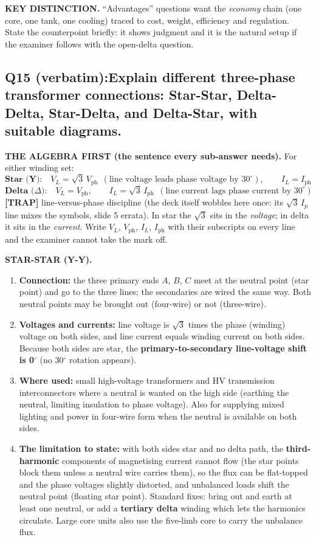 \documentclass[11pt]{article}
\newcommand{\qhead}[2]{\subsection*{\color{copper}#1\quad\color{iron}#2}}
\newcommand{\tagline}[1]{\textbf{\color{copper}#1}}
\newcommand{\keydist}[1]{\vspace{2pt}\textbf{\color{red}KEY DISTINCTION.} #1}
\newcommand{\trap}[1]{\vspace{2pt}\textbf{\color{red}[TRAP]} #1}
\begin{document}
\keydist{``Advantages'' questions want the \emph{economy} chain (one core, one tank, one cooling) traced to cost, weight, efficiency and regulation. State the counterpoint briefly: it shows judgment and it is the natural setup if the examiner follows with the open-delta question.}

\qhead{Q15 (verbatim):}{Explain different three-phase transformer connections: Star-Star, Delta-Delta, Star-Delta, and Delta-Star, with suitable diagrams.}

\tagline{THE ALGEBRA FIRST (the sentence every sub-answer needs).} For either winding set:
\[
\textbf{Star (Y):}\quad V_L = \sqrt{3}\, V_{\text{ph}}\ \ (\text{line voltage leads phase voltage by } 30^{\circ}), \qquad I_L = I_{\text{ph}}
\]
\[
\textbf{Delta (}\Delta\textbf{):}\quad V_L = V_{\text{ph}}, \qquad I_L = \sqrt{3}\, I_{\text{ph}}\ \ (\text{line current lags phase current by } 30^{\circ})
\]
\trap{line-versus-phase discipline (the deck itself wobbles here once: its $\sqrt{3}\,I_p$ line mixes the symbols, slide 5 errata). In star the $\sqrt{3}$ sits in the \emph{voltage}; in delta it sits in the \emph{current}. Write $V_L$, $V_{\text{ph}}$, $I_L$, $I_{\text{ph}}$ with their subscripts on every line and the examiner cannot take the mark off.}

\tagline{STAR-STAR (Y-Y).}
\begin{enumerate}[label=\arabic*.]
\item \textbf{Connection:} the three primary ends $A$, $B$, $C$ meet at the neutral point (star point) and go to the three lines; the secondaries are wired the same way. Both neutral points may be brought out (four-wire) or not (three-wire).
\item \textbf{Voltages and currents:} line voltage is $\sqrt{3}$ times the phase (winding) voltage on both sides, and line current equals winding current on both sides. Because both sides are star, the \textbf{primary-to-secondary line-voltage shift is 0$^\circ$} (no 30$^\circ$ rotation appears).
\item \textbf{Where used:} small high-voltage transformers and HV transmission interconnectors where a neutral is wanted on the high side (earthing the neutral, limiting insulation to phase voltage). Also for supplying mixed lighting and power in four-wire form when the neutral is available on both sides.
\item \textbf{The limitation to state:} with both sides star and no delta path, the \textbf{third-harmonic} components of magnetising current cannot flow (the star points block them unless a neutral wire carries them), so the flux can be flat-topped and the phase voltages slightly distorted, and unbalanced loads shift the neutral point (floating star point). Standard fixes: bring out and earth at least one neutral, or add a \textbf{tertiary delta} winding which lets the harmonics circulate. Large core units also use the five-limb core to carry the unbalance flux.
\end{enumerate}
\end{document}
